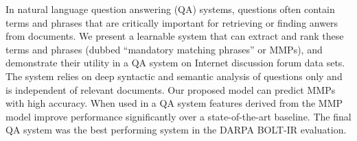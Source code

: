 In natural language question answering (QA) systems, questions often contain terms and phrases that are critically important for 
 retrieving or finding anwers from documents. We present a learnable system that
 can extract and rank these terms and phrases (dubbed ``mandatory matching
 phrases'' or MMPs), and demonstrate their utility in a QA system on Internet
 discussion forum data sets. The system relies on  deep syntactic and semantic
 analysis of questions only and is independent of relevant documents. Our
 proposed model can predict MMPs with high accuracy. When used in a QA system
 features derived from the MMP model improve performance significantly over a
 state-of-the-art baseline. The final QA system was the best performing system
 in the DARPA BOLT-IR evaluation.

